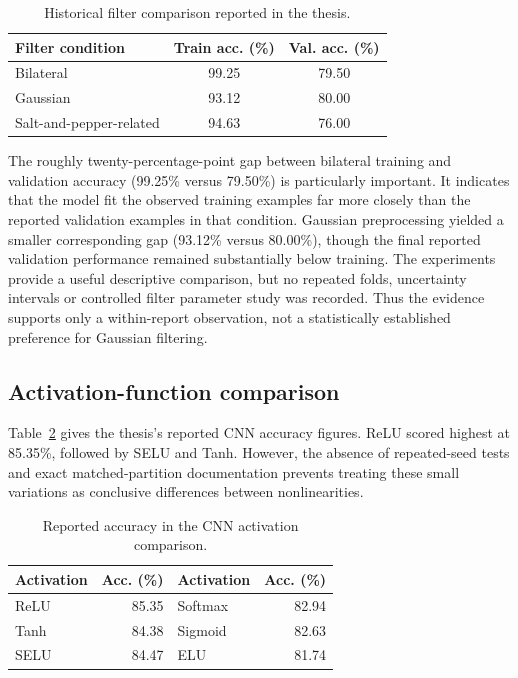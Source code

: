 \documentclass[conference,a4paper]{IEEEtran}
\begin{document}
\begin{table}[!t]\centering\caption{Historical filter comparison reported in the thesis.}\label{tab:filters}\footnotesize
\begin{tabular}{lcc}\toprule Filter condition & Train acc. (\%) & Val. acc. (\%)\\\midrule Bilateral & 99.25 & 79.50\\ Gaussian & 93.12 & 80.00\\ Salt-and-pepper-related & 94.63 & 76.00\\\bottomrule\end{tabular}
\end{table}

The roughly twenty-percentage-point gap between bilateral training and validation accuracy (99.25\% versus 79.50\%) is particularly important. It indicates that the model fit the observed training examples far more closely than the reported validation examples in that condition. Gaussian preprocessing yielded a smaller corresponding gap (93.12\% versus 80.00\%), though the final reported validation performance remained substantially below training. The experiments provide a useful descriptive comparison, but no repeated folds, uncertainty intervals or controlled filter parameter study was recorded. Thus the evidence supports only a within-report observation, not a statistically established preference for Gaussian filtering.


\subsection{Activation-function comparison}
Table~\ref{tab:activations} gives the thesis's reported CNN accuracy figures. ReLU scored highest at 85.35\%, followed by SELU and Tanh. However, the absence of repeated-seed tests and exact matched-partition documentation prevents treating these small variations as conclusive differences between nonlinearities.

\begin{table}[!t]\centering\caption{Reported accuracy in the CNN activation comparison.}\label{tab:activations}\footnotesize
\begin{tabular}{lrlr}\toprule Activation & Acc. (\%) & Activation & Acc. (\%)\\\midrule ReLU & 85.35 & Softmax & 82.94\\ Tanh & 84.38 & Sigmoid & 82.63\\ SELU & 84.47 & ELU & 81.74\\\bottomrule\end{tabular}
\end{table}
\end{document}

